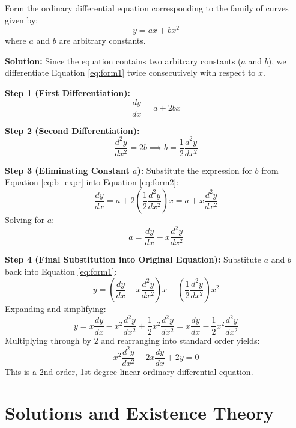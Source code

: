 \documentclass[11pt, a4paper, openany, oneside]{book}
\begin{document}
\begin{examplebox}
Form the ordinary differential equation corresponding to the family of curves given by:
\begin{equation}
    y = a x + b x^2 \label{eq:form1}
\end{equation}
where $a$ and $b$ are arbitrary constants.

\textbf{Solution:}
Since the equation contains two arbitrary constants ($a$ and $b$), we differentiate Equation \eqref{eq:form1} twice consecutively with respect to $x$.

\textbf{Step 1 (First Differentiation):}
\begin{equation}
    \frac{dy}{dx} = a + 2bx \label{eq:form2}
\end{equation}

\textbf{Step 2 (Second Differentiation):}
\begin{equation}
    \frac{d^2 y}{dx^2} = 2b \implies b = \frac{1}{2} \frac{d^2 y}{dx^2} \label{eq:b_expr}
\end{equation}

\textbf{Step 3 (Eliminating Constant $a$):}
Substitute the expression for $b$ from Equation \eqref{eq:b_expr} into Equation \eqref{eq:form2}:
\[
\frac{dy}{dx} = a + 2\left(\frac{1}{2} \frac{d^2 y}{dx^2}\right)x = a + x \frac{d^2 y}{dx^2}
\]
Solving for $a$:
\begin{equation}
    a = \frac{dy}{dx} - x \frac{d^2 y}{dx^2} \label{eq:a_expr}
\end{equation}

\textbf{Step 4 (Final Substitution into Original Equation):}
Substitute $a$ and $b$ back into Equation \eqref{eq:form1}:
\[
y = \left(\frac{dy}{dx} - x \frac{d^2 y}{dx^2}\right)x + \left(\frac{1}{2} \frac{d^2 y}{dx^2}\right)x^2
\]
Expanding and simplifying:
\[
y = x \frac{dy}{dx} - x^2 \frac{d^2 y}{dx^2} + \frac{1}{2}x^2 \frac{d^2 y}{dx^2} = x \frac{dy}{dx} - \frac{1}{2}x^2 \frac{d^2 y}{dx^2}
\]
Multiplying through by $2$ and rearranging into standard order yields:
\begin{equation}
    x^2 \frac{d^2 y}{dx^2} - 2x \frac{dy}{dx} + 2y = 0
\end{equation}
This is a 2nd-order, 1st-degree linear ordinary differential equation.
\end{examplebox}

\chapter{Solutions and Existence Theory}
\end{document}
